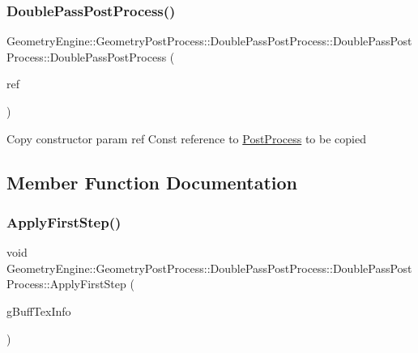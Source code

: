 \subsubsection{\texorpdfstring{DoublePassPostProcess()}{DoublePassPostProcess()}\hspace{0.1cm}{\footnotesize\ttfamily [2/2]}}
{\footnotesize\ttfamily Geometry\+Engine\+::\+Geometry\+Post\+Process\+::\+Double\+Pass\+Post\+Process\+::\+Double\+Pass\+Post\+Process\+::\+Double\+Pass\+Post\+Process (\begin{DoxyParamCaption}\item[{const \mbox{\hyperlink{class_geometry_engine_1_1_geometry_post_process_1_1_double_pass_post_process_1_1_double_pass_post_process}{Double\+Pass\+Post\+Process}} \&}]{ref }\end{DoxyParamCaption})\hspace{0.3cm}{\ttfamily [inline]}}

Copy constructor param ref Const reference to \mbox{\hyperlink{class_geometry_engine_1_1_geometry_post_process_1_1_post_process}{Post\+Process}} to be copied 

\subsection{Member Function Documentation}
\mbox{\label{class_geometry_engine_1_1_geometry_post_process_1_1_double_pass_post_process_1_1_double_pass_post_process_a1e32828640812e382cdd1b66207c88ee}} 
\subsubsection{\texorpdfstring{ApplyFirstStep()}{ApplyFirstStep()}}
{\footnotesize\ttfamily void Geometry\+Engine\+::\+Geometry\+Post\+Process\+::\+Double\+Pass\+Post\+Process\+::\+Double\+Pass\+Post\+Process\+::\+Apply\+First\+Step (\begin{DoxyParamCaption}\item[{const \mbox{\hyperlink{struct_geometry_engine_1_1_g_buffer_texture_info}{G\+Buffer\+Texture\+Info}} \&}]{g\+Buff\+Tex\+Info }\end{DoxyParamCaption})\hspace{0.3cm}{\ttfamily [virtual]}}


